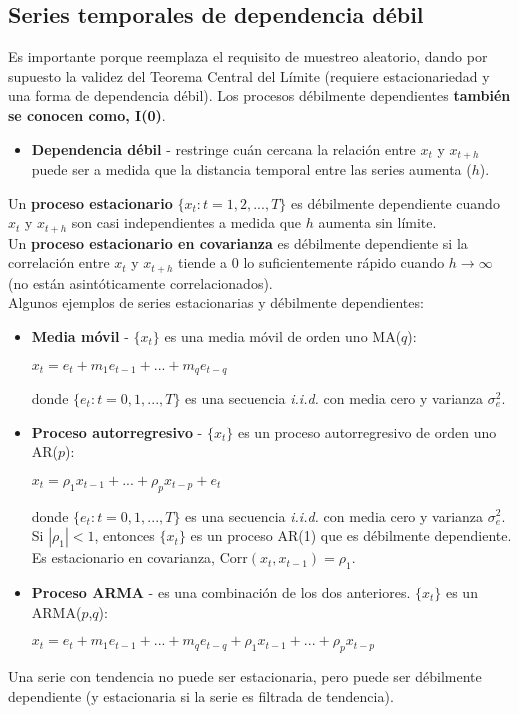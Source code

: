 \documentclass[10pt, a4paper, landscape]{extarticle}
\newcommand{\Corr}{\mathrm{Corr}}
\begin{document}
\begin{multicols}{3}
	\subsection*{Series temporales de dependencia débil}
		Es importante porque reemplaza el requisito de muestreo aleatorio, dando por supuesto la validez del Teorema Central del Límite (requiere estacionariedad y una forma de dependencia débil). Los procesos débilmente dependientes \textbf{también se conocen como, I(0)}.
		\begin{itemize}[leftmargin=*]
			\item \textbf{Dependencia débil} - restringe cuán cercana la relación entre $x_t$ y $x_{t+h}$ puede ser a medida que la distancia temporal entre las series aumenta ($h$).
		\end{itemize}
		Un \textbf{proceso estacionario} $\lbrace x_t: t = 1, 2, ..., T \rbrace$ es débilmente dependiente cuando $x_t$ y $x_{t+h}$ son casi independientes a medida que $h$ aumenta sin límite. \\
		Un \textbf{proceso estacionario en covarianza} es débilmente dependiente si la correlación entre $x_t$ y $x_{t+h}$ tiende a $0$ lo suficientemente rápido cuando $h \rightarrow \infty$ (no están asintóticamente correlacionados). \\
		Algunos ejemplos de series estacionarias y débilmente dependientes:
		\begin{itemize}[leftmargin=*]
			\item \textbf{Media móvil} - $\lbrace x_t \rbrace$ es una media móvil de orden uno MA($q$):
			\begin{center}
				$x_t = e_t + m_1 e_{t-1} + ... + m_q e_{t-q}$
			\end{center}
			donde $\lbrace e_t: t = 0, 1, ..., T \rbrace$ es una secuencia \textsl{i.i.d.} con media cero y varianza $\sigma^2_e$.
			\item \textbf{Proceso autorregresivo} - $\lbrace x_t \rbrace$ es un proceso autorregresivo de orden uno AR($p$):
			\begin{center}
				$x_t = \rho_1 x_{t-1} + ... + \rho_p x_{t-p} + e_t$
			\end{center}
			donde $\lbrace e_t: t = 0, 1, ..., T \rbrace$ es una secuencia \textsl{i.i.d.} con media cero y varianza $\sigma^2_e$. \\
			Si $|\rho_1|<1$, entonces $\lbrace x_t \rbrace$ es un proceso AR(1) que es débilmente dependiente. Es estacionario en covarianza, $\Corr(x_t, x_{t-1}) = \rho_1$.
			\item \textbf{Proceso ARMA} - es una combinación de los dos anteriores. $\lbrace x_t \rbrace$ es un ARMA($p$,$q$):
			\begin{center}
				$x_t = e_t + m_1 e_{t-1} + ... + m_q e_{t-q} + \rho_1 x_{t-1} + ... + \rho_p x_{t-p}$
			\end{center}
		\end{itemize}
		Una serie con tendencia no puede ser estacionaria, pero puede ser débilmente dependiente (y estacionaria si la serie es filtrada de tendencia).
\columnbreak

\end{multicols}
\end{document}
